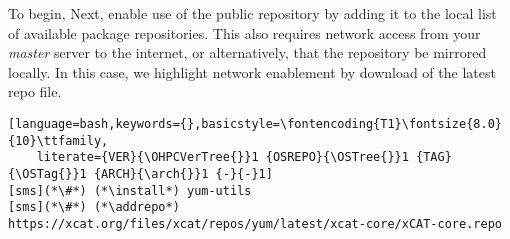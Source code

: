 To begin,
\else
Next, 
\fi
enable use of the public \xCAT{} repository by adding it to the local list
of available package repositories. This also requires network access from
your {\em master} server to the internet, or alternatively, that
the repository be mirrored locally. In this case, we highlight network
enablement by download of the
latest \xCAT{} repo file.

\begin{lstlisting}[language=bash,keywords={},basicstyle=\fontencoding{T1}\fontsize{8.0}{10}\ttfamily,
	literate={VER}{\OHPCVerTree{}}1 {OSREPO}{\OSTree{}}1 {TAG}{\OSTag{}}1 {ARCH}{\arch{}}1 {-}{-}1]
[sms](*\#*) (*\install*) yum-utils
[sms](*\#*) (*\addrepo*) https://xcat.org/files/xcat/repos/yum/latest/xcat-core/xCAT-core.repo
\end{lstlisting}

